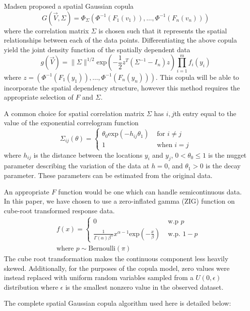 \documentclass{article}
\begin{document}
Madsen\cite{madsen09} proposed a spatial Gaussian copula
$$
G(\vec{V}, \Sigma) = \Phi_{\Sigma}(\Phi^{-1}(F_1(v_1)), \ldots, \Phi^{-1}(F_n(v_n)))
$$
where the correlation matrix $\Sigma$ is chosen such that it represents the spatial relationships between each of the data points.
Differentiating the above copula yield the joint density function of the spatially dependent data
$$
g(\vec{V}) = \| \Sigma \|^{1/2} \text{exp}\left(-\frac{1}{2} z^T (\Sigma^{-1} - I_n) z\right) \prod_{i = 1}^m f_i(y_i)
$$
where $z = (\Phi^{-1}(F_1(y_1)), \ldots, \Phi^{-1}(F_n(y_n)))$.
This copula will be able to incorporate the spatial dependency structure, however this method requires the appropriate selection of $F$ and $\Sigma$.

A common choice for spatial correlation matrix $\Sigma$ has $i,j$th entry equal to the value of the exponential correlogram function
$$
\Sigma_{ij}(\theta) = 
	\begin{cases}
		\theta_0 \text{exp}(-h_{ij} \theta_1) & \text{ for } i \neq j\\
		1 & \text{ when } i = j
	\end{cases}
$$
where $h_{ij}$ is the distance between the locations $y_i$ and $y_j$, $0 < \theta_0 \leq 1$ is the nugget parameter describing the variation of the data at $h = 0$, and $\theta_1 > 0$ is the decay parameter.
These parameters can be estimated from the original data\cite{madsen09}.

An appropriate $F$ function would be one which can handle semicontinuous data.
In this paper, we have chosen to use a zero-inflated gamma (ZIG) function on cube-root transformed response data.
\begin{align*}
&f(x) = 
\begin{cases}
	0 & \text{ w.p } p \\
	\frac{1}{\Gamma(\alpha) \beta^\alpha} x^{\alpha -1} \text{exp}\left(-\frac{x}{\beta}\right) & \text{ w.p. } 1 - p 
\end{cases} 
\\
&\text{where } p \sim \text{Bernoulli}(\pi)
\end{align*}
The cube root transformation makes the continuous component less heavily skewed.
Additionally, for the purposes of the copula model, zero values were instead replaced with uniform random variables sampled from a $U(0, \epsilon)$ distribution where $\epsilon$ is the smallest nonzero value in the observed dataset.

The complete spatial Gaussian copula algorithm used here is detailed below:
\end{document}
